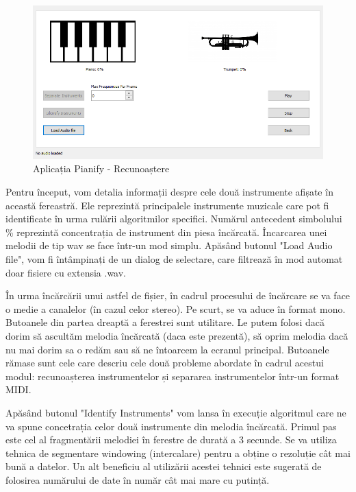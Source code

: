 \documentclass[a4paper,12pt]{report}
\begin{document}
   \begin{figure}[H]
   		\begin{center}
   		\includegraphics[scale=0.4]{images/pianify_recognizeviewPNG.PNG}
   		\end{center}
   		\caption{Aplicația Pianify - Recunoaștere}
   		\label{fig:pianify_recognizeview}
   \end{figure}
	
	Pentru început, vom detalia informații despre cele două instrumente afișate în această fereastră. Ele reprezintă principalele instrumente muzicale care pot fi identificate în urma rulării algoritmilor specifici.  Numărul antecedent simbolului \% reprezintă concentrația de instrument din piesa încărcată. Încarcarea unei melodii de tip wav se face într-un mod simplu. Apăsând butonul "Load Audio file", vom fi întâmpinați de un dialog de selectare, care filtrează în mod automat doar fisiere cu extensia .wav. 
	
	În urma încărcării unui astfel de fișier, în cadrul procesului de încărcare se va face o medie a canalelor (în cazul celor stereo). Pe scurt, se va aduce în format mono.  Butoanele din partea dreaptă a ferestrei sunt utilitare. Le putem folosi dacă dorim să ascultăm melodia încărcată (daca este prezentă), să oprim melodia dacă nu mai dorim sa o redăm sau să ne întoarcem la ecranul principal. Butoanele rămase sunt cele care descriu cele două probleme abordate în cadrul acestui modul: recunoașterea instrumentelor și separarea instrumentelor într-un format MIDI.
	
	Apăsând butonul "Identify Instruments" vom lansa în execuție algoritmul care ne va spune concetrația celor două instrumente din melodia încărcată. Primul pas este cel al fragmentării melodiei în ferestre de durată a 3 secunde. Se va utiliza tehnica de segmentare windowing (intercalare) pentru a obține o rezoluție cât mai bună a datelor. Un alt beneficiu al utilizării acestei tehnici este sugerată de folosirea numărului de date în număr cât mai mare cu putință. 
	
\end{document}
